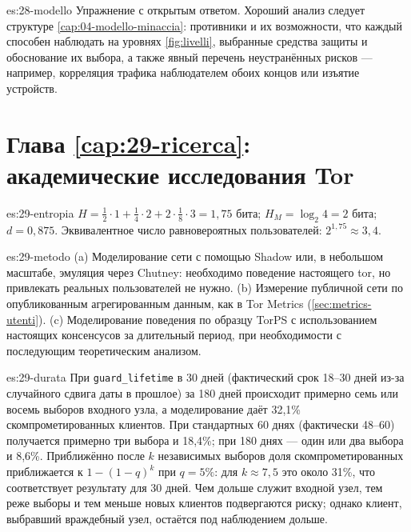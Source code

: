 \begin{soluzione}{es:28-modello}
Упражнение с открытым ответом. Хороший анализ следует структуре \cref{cap:04-modello-minaccia}: противники и их возможности, что каждый способен наблюдать на уровнях \cref{fig:livelli}, выбранные средства защиты и обоснование их выбора, а также явный перечень неустранённых рисков — например, корреляция трафика наблюдателем обоих концов или изъятие устройств.
\end{soluzione}

\section*{Глава \ref{cap:29-ricerca}: академические исследования Tor}

\begin{soluzione}{es:29-entropia}
$H = \tfrac12 \cdot 1 + \tfrac14 \cdot 2 + 2 \cdot \tfrac18 \cdot 3 = 1{,}75$ бита; $H_M = \log_2 4 = 2$ бита; $d = 0{,}875$. Эквивалентное число равновероятных пользователей: $2^{1{,}75} \approx 3{,}4$.
\end{soluzione}

\begin{soluzione}{es:29-metodo}
(a) Моделирование сети с помощью Shadow или, в небольшом масштабе, эмуляция через Chutney: необходимо поведение настоящего tor, но привлекать реальных пользователей не нужно. (b) Измерение публичной сети по опубликованным агрегированным данным, как в Tor Metrics (\cref{sec:metrics-utenti}). (c) Моделирование поведения по образцу TorPS с использованием настоящих консенсусов за длительный период, при необходимости с последующим теоретическим анализом.
\end{soluzione}

\begin{soluzione}{es:29-durata}
При \texttt{guard\_lifetime} в 30 дней (фактический срок 18--30 дней из-за случайного сдвига даты в прошлое) за 180 дней происходит примерно семь или восемь выборов входного узла, а моделирование даёт 32,1\% скомпрометированных клиентов. При стандартных 60 днях (фактически 48--60) получается примерно три выбора и 18,4\%; при 180 днях — один или два выбора и 8,6\%. Приближённо после $k$ независимых выборов доля скомпрометированных приближается к $1-(1-q)^k$ при $q = 5\%$: для $k\approx 7{,}5$ это около 31\%, что соответствует результату для 30 дней. Чем дольше служит входной узел, тем реже выборы и тем меньше новых клиентов подвергаются риску; однако клиент, выбравший враждебный узел, остаётся под наблюдением дольше.
\end{soluzione}

